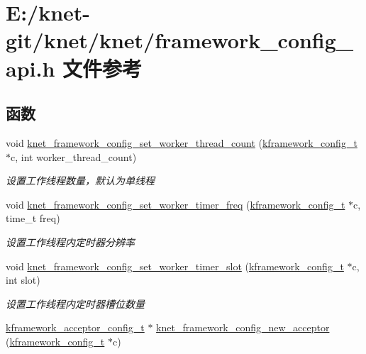 \hypertarget{a00057}{}\section{E\+:/knet-\/git/knet/knet/framework\+\_\+config\+\_\+api.h 文件参考}
\label{a00057}
\subsection*{函数}
\begin{DoxyCompactItemize}
\item 
void \hyperlink{a00104_ga470f4acf8c70060852d435753375fa3b_ga470f4acf8c70060852d435753375fa3b}{knet\+\_\+framework\+\_\+config\+\_\+set\+\_\+worker\+\_\+thread\+\_\+count} (\hyperlink{a00051_adeaf952e0f0887507ff836385bf54874_adeaf952e0f0887507ff836385bf54874}{kframework\+\_\+config\+\_\+t} $\ast$c, int worker\+\_\+thread\+\_\+count)
\begin{DoxyCompactList}\small\item\em 设置工作线程数量，默认为单线程 \end{DoxyCompactList}\item 
void \hyperlink{a00104_ga42497b09d9d0c4039a062ff750ead0a9_ga42497b09d9d0c4039a062ff750ead0a9}{knet\+\_\+framework\+\_\+config\+\_\+set\+\_\+worker\+\_\+timer\+\_\+freq} (\hyperlink{a00051_adeaf952e0f0887507ff836385bf54874_adeaf952e0f0887507ff836385bf54874}{kframework\+\_\+config\+\_\+t} $\ast$c, time\+\_\+t freq)
\begin{DoxyCompactList}\small\item\em 设置工作线程内定时器分辨率 \end{DoxyCompactList}\item 
void \hyperlink{a00104_gae0c5bc540a44a88d64390845744f736f_gae0c5bc540a44a88d64390845744f736f}{knet\+\_\+framework\+\_\+config\+\_\+set\+\_\+worker\+\_\+timer\+\_\+slot} (\hyperlink{a00051_adeaf952e0f0887507ff836385bf54874_adeaf952e0f0887507ff836385bf54874}{kframework\+\_\+config\+\_\+t} $\ast$c, int slot)
\begin{DoxyCompactList}\small\item\em 设置工作线程内定时器槽位数量 \end{DoxyCompactList}\item 
\hyperlink{a00051_a39c993eb450173e4fde04498d757f9b6_a39c993eb450173e4fde04498d757f9b6}{kframework\+\_\+acceptor\+\_\+config\+\_\+t} $\ast$ \hyperlink{a00104_ga681a7f8e071507cc60f8f56043fe4443_ga681a7f8e071507cc60f8f56043fe4443}{knet\+\_\+framework\+\_\+config\+\_\+new\+\_\+acceptor} (\hyperlink{a00051_adeaf952e0f0887507ff836385bf54874_adeaf952e0f0887507ff836385bf54874}{kframework\+\_\+config\+\_\+t} $\ast$c)

\end{DoxyCompactItemize}
